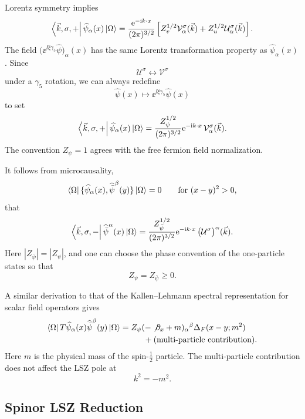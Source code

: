 Lorentz symmetry implies
\[
  \bra{\vec k,\sigma,+}\widehat\psi_\alpha(x)\ket\Omega
  =
  \frac{\mathrm{e}^{-\mathrm{i} k\cdot x}}{(2\pi)^{3/2}}
  \left[
    Z_v^{1/2}\mathcal V_\alpha^\sigma(\vec k)
    +
    Z_u^{1/2}\mathcal U_\alpha^\sigma(\vec k)
  \right].
\]
The field \(\bigl(\ee^{\ii\xi\gamma_5}\widehat\psi\bigr)_\alpha(x)\)
has the same Lorentz transformation property as
\(\widehat\psi_\alpha(x)\).  Since
\[
  \mathcal U^\sigma \longleftrightarrow \mathcal V^\sigma
\]
under a \(\gamma_5\) rotation, we can always redefine
\[
  \widehat\psi(x)\mapsto \ee^{\ii\xi\gamma_5}\widehat\psi(x)
\]
to set
\[
  \bra{\vec k,\sigma,+}\widehat\psi_\alpha(x)\ket\Omega
  =
  \frac{Z_\psi^{1/2}}{(2\pi)^{3/2}}
  \mathrm{e}^{-\mathrm{i} k\cdot x}\,
  \mathcal V_\alpha^\sigma(\vec k).
\]
The convention \(Z_\psi=1\) agrees with the free fermion field
normalization.

It follows from microcausality,
\[
  \bra\Omega
  \{\widehat\psi_\alpha(x),\widehat{\bar\psi}^{\beta}(y)\}
  \ket\Omega
  =
  0
  \qquad\text{for }(x-y)^2>0,
\]
that
\[
  \bra{\vec k,\sigma,-}\widehat{\bar\psi}^{\alpha}(x)\ket\Omega
  =
  \frac{Z_{\bar\psi}^{1/2}}{(2\pi)^{3/2}}
  \mathrm{e}^{-\mathrm{i} k\cdot x}\,
  \bigl(\mathcal U^\sigma\bigr)^\alpha(\vec k).
\]
Here \(|Z_{\bar\psi}|=|Z_\psi|\), and one can choose the phase convention
of the one-particle states so that
\[
  Z_\psi=Z_{\bar\psi}\ge0.
\]

A similar derivation to that of the Kallen--Lehmann spectral
representation for scalar field operators gives
\[
\begin{aligned}
  \bra\Omega T\widehat\psi_\alpha(x)\widehat{\bar\psi}^{\beta}(y)
  \ket\Omega
  &=
  Z_\psi
  (-\not{\partial}_x+m)_\alpha{}^\beta
  \Delta_F(x-y;m^2)
  \\
  &\hspace{1cm}
  +(\text{multi-particle contribution}).
\end{aligned}
\]
Here \(m\) is the physical mass of the spin-\(\frac12\) particle.  The
multi-particle contribution does not affect the LSZ pole at
\[
  k^2=-m^2.
\]

\subsection{Spinor LSZ Reduction}

